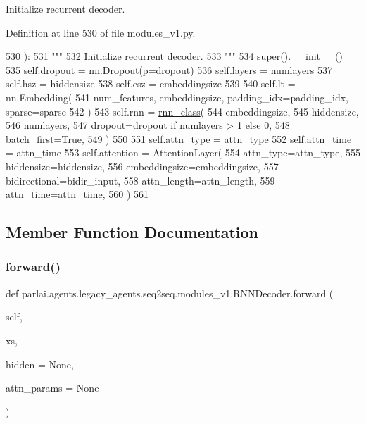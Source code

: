 \begin{DoxyVerb}Initialize recurrent decoder.
\end{DoxyVerb}
 

Definition at line 530 of file modules\+\_\+v1.\+py.


\begin{DoxyCode}
530     ):
531         \textcolor{stringliteral}{"""}
532 \textcolor{stringliteral}{        Initialize recurrent decoder.}
533 \textcolor{stringliteral}{        """}
534         super().\_\_init\_\_()
535         self.dropout = nn.Dropout(p=dropout)
536         self.layers = numlayers
537         self.hsz = hiddensize
538         self.esz = embeddingsize
539 
540         self.lt = nn.Embedding(
541             num\_features, embeddingsize, padding\_idx=padding\_idx, sparse=sparse
542         )
543         self.rnn = \hyperlink{namespaceseq2seq_1_1train_a1b062073c766f1d34a67f572ef256ba0}{rnn\_class}(
544             embeddingsize,
545             hiddensize,
546             numlayers,
547             dropout=dropout \textcolor{keywordflow}{if} numlayers > 1 \textcolor{keywordflow}{else} 0,
548             batch\_first=\textcolor{keyword}{True},
549         )
550 
551         self.attn\_type = attn\_type
552         self.attn\_time = attn\_time
553         self.attention = AttentionLayer(
554             attn\_type=attn\_type,
555             hiddensize=hiddensize,
556             embeddingsize=embeddingsize,
557             bidirectional=bidir\_input,
558             attn\_length=attn\_length,
559             attn\_time=attn\_time,
560         )
561 
\end{DoxyCode}


\subsection{Member Function Documentation}
\mbox{\label{classparlai_1_1agents_1_1legacy__agents_1_1seq2seq_1_1modules__v1_1_1RNNDecoder_aa0fdddaf98d3385b432a9b52a0d1adbb}} 
\subsubsection{\texorpdfstring{forward()}{forward()}}
{\footnotesize\ttfamily def parlai.\+agents.\+legacy\+\_\+agents.\+seq2seq.\+modules\+\_\+v1.\+R\+N\+N\+Decoder.\+forward (\begin{DoxyParamCaption}\item[{}]{self,  }\item[{}]{xs,  }\item[{}]{hidden = {\ttfamily None},  }\item[{}]{attn\+\_\+params = {\ttfamily None} }\end{DoxyParamCaption})}


